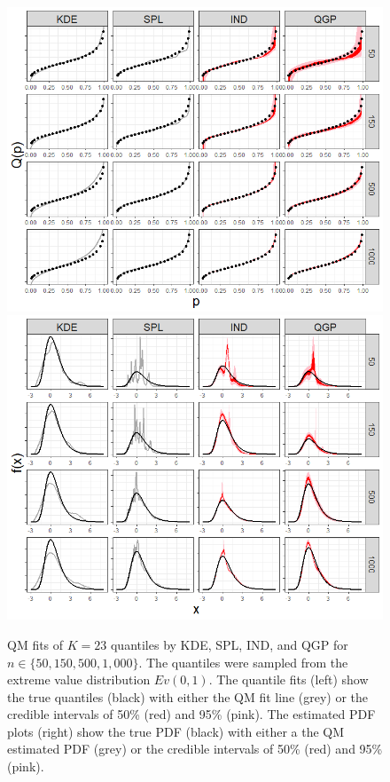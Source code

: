 \documentclass[preprint,12pt,authoryear]{elsarticle}
\begin{document}
\begin{figure}[hbt!]
\centering
  \centering
  \includegraphics[width=.49\linewidth]{Images/quants_evd.png}
  \centering
  \includegraphics[width=.49\linewidth]{Images/dens_evd.png}
\caption{QM fits of $K=23$ quantiles by KDE, SPL, IND, and QGP for $n \in \{50, 150, 500, 1{,}000\}$. The quantiles were sampled from the extreme value distribution $Ev(0,1)$. The quantile fits (left) show the true quantiles (black) with either the QM fit line (grey) or the credible intervals of 50\% (red) and 95\% (pink). 
The estimated PDF plots (right) show the true PDF (black) with either a the QM estimated PDF (grey) or the credible intervals of 50\% (red) and 95\% (pink).}
\label{fig:evd_fits}
\end{figure}
\end{document}
